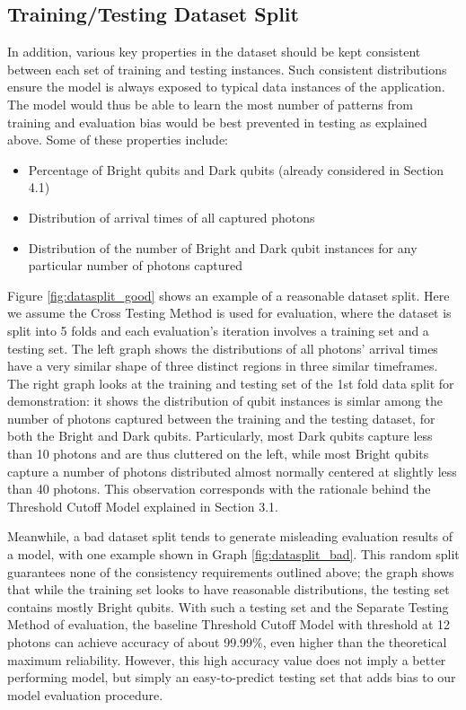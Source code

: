 \documentclass[letterpaper,twocolumn,10pt]{article}
\begin{document}
\subsection{Training/Testing Dataset Split}

In addition, various key properties in the dataset should be kept consistent between each set of training and testing instances. Such consistent distributions ensure the model is always exposed to typical data instances of the application. The model would thus be able to learn the most number of patterns from training and evaluation bias would be best prevented in testing as explained above. Some of these properties include:

\begin{itemize}
    \item Percentage of Bright qubits and Dark qubits (already considered in Section 4.1)
    \item Distribution of arrival times of all captured photons
    \item Distribution of the number of Bright and Dark qubit instances for any particular number of photons captured
\end{itemize}

Figure \ref{fig:datasplit_good} shows an example of a reasonable dataset split. Here we assume the Cross Testing Method is used for evaluation, where the dataset is split into 5 folds and each evaluation's iteration involves a training set and a testing set. The left graph shows the distributions of all photons' arrival times have a very similar shape of three distinct regions in three similar timeframes. The right graph looks at the training and testing set of the 1st fold data split for demonstration: it shows the distribution of qubit instances is simlar among the number of photons captured between the training and the testing dataset, for both the Bright and Dark qubits. Particularly, most Dark qubits capture less than 10 photons and are thus cluttered on the left, while most Bright qubits capture a number of photons distributed almost normally centered at slightly less than 40 photons. This observation corresponds with the rationale behind the Threshold Cutoff Model explained in Section 3.1. 

Meanwhile, a bad dataset split tends to generate misleading evaluation results of a model, with one example shown in Graph \ref{fig:datasplit_bad}. This random split guarantees none of the consistency requirements outlined above; the graph shows that while the training set looks to have reasonable distributions, the testing set contains mostly Bright qubits. With such a testing set and the Separate Testing Method of evaluation, the baseline Threshold Cutoff Model with threshold at 12 photons can achieve accuracy of about 99.99\%, even higher than the theoretical maximum reliability. However, this high accuracy value does not imply a better performing model, but simply an easy-to-predict testing set that adds bias to our model evaluation procedure.
\end{document}
